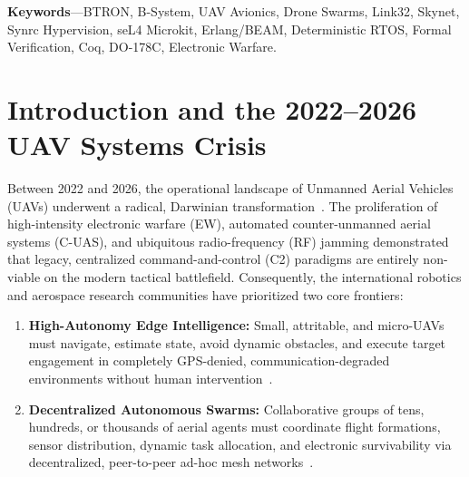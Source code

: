 \documentclass[10pt,journal,compsoc,twocolumn]{article}
\begin{document}
\noindent\textbf{\small Keywords}---BTRON, B-System, UAV Avionics, Drone Swarms, Link32, Skynet, Synrc Hypervision, seL4 Microkit, Erlang/BEAM, Deterministic RTOS, Formal Verification, Coq, DO-178C, Electronic Warfare.

\section{Introduction and the 2022--2026 UAV Systems Crisis}
\label{sec:intro}

Between 2022 and 2026, the operational landscape of Unmanned Aerial Vehicles (UAVs) underwent a radical, Darwinian transformation~\cite{scharre2023battlefield,calcara2022drones}. The proliferation of high-intensity electronic warfare (EW), automated counter-unmanned aerial systems (C-UAS), and ubiquitous radio-frequency (RF) jamming demonstrated that legacy, centralized command-and-control (C2) paradigms are entirely non-viable on the modern tactical battlefield. Consequently, the international robotics and aerospace research communities have prioritized two core frontiers:
\begin{enumerate}[leftmargin=*]
    \item \textbf{High-Autonomy Edge Intelligence:} Small, attritable, and micro-UAVs must navigate, estimate state, avoid dynamic obstacles, and execute target engagement in completely GPS-denied, communication-degraded environments without human intervention~\cite{loquercio2021autonomous,falanga2020dynamic}.
    \item \textbf{Decentralized Autonomous Swarms:} Collaborative groups of tens, hundreds, or thousands of aerial agents must coordinate flight formations, sensor distribution, dynamic task allocation, and electronic survivability via decentralized, peer-to-peer ad-hoc mesh networks~\cite{olfati2006flocking,tonpa2025skynet}.
\end{enumerate}
\end{document}
